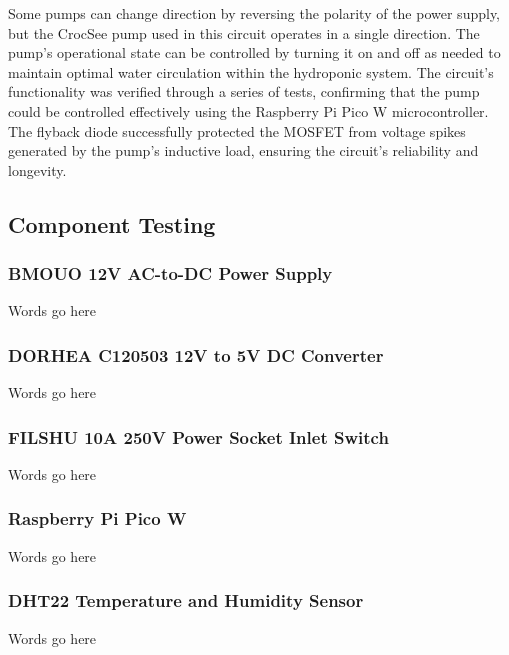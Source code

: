 \documentclass[12pt]{article}
\begin{document}
\newline
\newline
\noindent Some pumps can change direction by reversing the polarity of the power supply, but the CrocSee pump used in this circuit operates in a single direction. The pump's operational state can be controlled by turning it on and off as needed to maintain optimal water circulation within the hydroponic system. The circuit's functionality was verified through a series of tests, confirming that the pump could be controlled effectively using the Raspberry Pi Pico W microcontroller. The flyback diode successfully protected the MOSFET from voltage spikes generated by the pump's inductive load, ensuring the circuit's reliability and longevity.


\subsection{Component Testing}
\subsubsection{BMOUO 12V AC-to-DC Power Supply}
\noindent Words go here
\newline
\newline
\subsubsection{DORHEA C120503 12V to 5V DC Converter}
\noindent Words go here
\newline
\newline
\subsubsection{FILSHU 10A 250V Power Socket Inlet Switch}
\noindent Words go here
\newline
\newline
\subsubsection{Raspberry Pi Pico W}
\noindent Words go here
\newline
\newline
\subsubsection{DHT22 Temperature and Humidity Sensor}
\noindent Words go here
\newline
\newline
\end{document}
